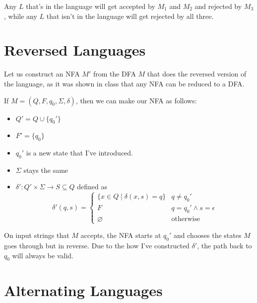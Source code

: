 \documentclass[12pt]{article}
\begin{document}
Any $L$ that's in the language will get accepted by $M_1$ and $M_2$ and rejected by $M_3$,
while any $L$ that isn't in the language will get rejected by all three.

\pagebreak

\section{Reversed Languages}

Let us construct an NFA $M'$ from the DFA $M$ that does the reversed version of the language,
as it was shown in class that any NFA can be reduced to a DFA.

If $M=(Q, F, q_0, \Sigma, \delta)$, then we can make our NFA as follows:
\begin{itemize}[nolistsep]
    \item $Q'=Q \cup \{q_0'\}$
    \item $F'=\{q_0\}$
    \item $q_0'$ is a new state that I've introduced.
    \item $\Sigma$ stays the same
    \item $\delta': Q' \times \Sigma \rightarrow S \subseteq Q$ defined as
          \[\delta'(q, s)=\begin{cases}
                  \{x \in Q \mid \delta(x, s)=q\} & q \ne q_0'                \\
                  F                               & q=q_0' \land s = \epsilon \\
                  \varnothing                     & \text{otherwise}
              \end{cases}\]
\end{itemize}

On input strings that $M$ accepts, the NFA starts at $q_0'$ and chooses
the states $M$ goes through but in reverse.
Due to the how I've constructed $\delta'$, the path back to $q_0$
will always be valid.

\section{Alternating Languages}
\end{document}
